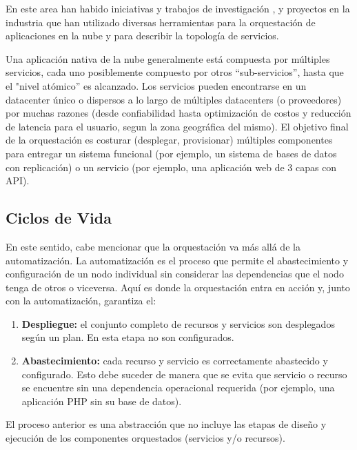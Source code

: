         En este area han habido iniciativas y trabajos de investigación \cite{Antonescu2012-ml,Juve2011-ob,Liu2011-vw,Binz2012-ru}, y proyectos en la industria \cite{Ibm2016-xb,Ibm2013-az} que han utilizado diversas herramientas para la orquestación de aplicaciones en la nube y para describir la topología de servicios.
        
        Una aplicación nativa de la nube generalmente está compuesta por múltiples servicios, cada uno posiblemente compuesto por otros “sub-servicios”, hasta que el "nivel atómico” es alcanzado. Los servicios pueden encontrarse en un datacenter único o dispersos a lo largo de múltiples datacenters (o proveedores) por muchas razones (desde confiabilidad hasta optimización de costos y reducción de latencia para el usuario, segun la zona geográfica del mismo). El objetivo final de la orquestación es costurar (desplegar, provisionar) múltiples componentes para entregar un sistema funcional (por ejemplo, un sistema de bases de datos con replicación) o un servicio (por ejemplo, una aplicación web de 3 capas con API).
	    
	    \subsection{Ciclos de Vida}
        En este sentido, cabe mencionar que la orquestación va más allá de la automatización. La automatización es el proceso que permite el abastecimiento y configuración de un nodo individual sin considerar las dependencias que el nodo tenga de otros o viceversa. Aquí es donde la orquestación entra en acción y, junto con la automatización, garantiza el:
        
        \begin{enumerate}
            \item \textbf{Despliegue: }el conjunto completo de recursos y servicios son desplegados según un plan. En esta etapa no son configurados.
            
            \item \textbf{Abastecimiento:} cada recurso y servicio es correctamente abastecido y configurado. Esto debe suceder de manera que se evita que servicio o recurso se encuentre sin una dependencia operacional requerida (por ejemplo, una aplicación PHP sin su base de datos).
        \end{enumerate}

	    El proceso anterior es una abstracción que no incluye las etapas de diseño y ejecución de los componentes orquestados (servicios y/o recursos).
        
